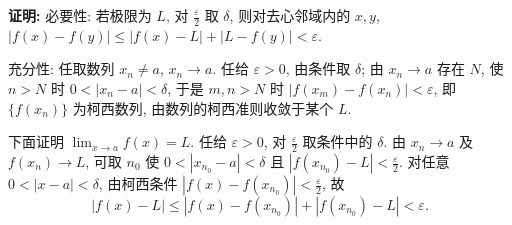\documentclass[UTF8,openany]{ctexbook}
\theoremstyle{chinesetextbook}
\newenvironment{cnproof}{\par\indent\textbf{证明:} \ignorespaces}{\par}
\begin{document}
\begin{cnproof}
必要性: 若极限为 $L$, 对 $\displaystyle\frac\varepsilon2$ 取 $\delta$, 则对去心邻域内的 $x,y$, $|f(x)-f(y)|\le|f(x)-L|+|L-f(y)|<\varepsilon$.

充分性: 任取数列 $x_n\ne a$, $x_n\to a$. 任给 $\varepsilon>0$, 由条件取 $\delta$; 由 $x_n\to a$ 存在 $N$, 使 $n>N$ 时 $0<|x_n-a|<\delta$, 于是 $m,n>N$ 时 $|f(x_m)-f(x_n)|<\varepsilon$, 即 $\{f(x_n)\}$ 为柯西数列, 由数列的柯西准则收敛于某个 $L$.

下面证明 $\displaystyle\lim_{x\to a}f(x)=L$. 任给 $\varepsilon>0$, 对 $\displaystyle\frac\varepsilon2$ 取条件中的 $\delta$. 由 $x_n\to a$ 及 $f(x_n)\to L$, 可取 $n_0$ 使 $0<|x_{n_0}-a|<\delta$ 且 $\displaystyle|f(x_{n_0})-L|<\frac\varepsilon2$. 对任意 $0<|x-a|<\delta$, 由柯西条件 $\displaystyle|f(x)-f(x_{n_0})|<\frac\varepsilon2$, 故
\[
|f(x)-L|\le|f(x)-f(x_{n_0})|+|f(x_{n_0})-L|<\varepsilon.
\]
\end{cnproof}
\end{document}
